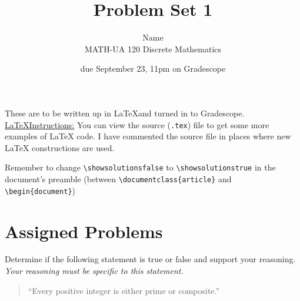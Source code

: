 \documentclass{article}
\title{Problem Set 1}
\author{%
    Name
\\  MATH-UA 120 Discrete Mathematics
}
\date{due September 23, 11pm on Gradescope}
\newif\ifshowsolutions
\newcommand{\danger}{\marginpar[\hfill\dbend]{\dbend\hfill}}
\theoremstyle{definition}
\begin{document}
\maketitle



These are to be written up in \LaTeX and turned in to Gradescope.\\



\ifshowsolutions
    \SetupExSheets{solution/print=true}
\else
    \danger
 \underline{ \LaTeX  Instructions:}  You can view the source (\texttt{.tex}) file to get some more examples of \LaTeX{} code.  I have commented the source file in places where new \LaTeX{} constructions are used.
  
  Remember to change \verb|\showsolutionsfalse| to \verb|\showsolutionstrue|
    in the document's preamble 
    (between \verb|\documentclass{article}| and \verb|\begin{document}|)
\fi

\section*{Assigned Problems}

\begin{question}
Determine if the following statement is true or false and support your reasoning. \emph{Your reasoning must be specific to this statement.}
\begin{quote}
``Every positive integer is either prime or composite.''
\end{quote}
\end{question}
\begin{solution}
\end{solution}
\end{document}
